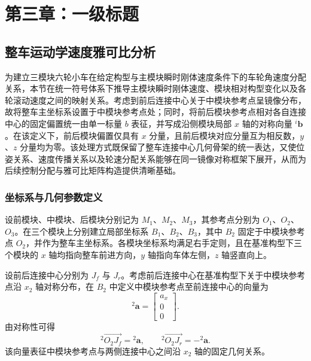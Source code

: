 \setlength{\baselineskip}{20pt}
\chapter{第三章：一级标题}
\label{cha:chap3}
\section{整车运动学速度雅可比分析}

为建立三模块六轮小车在给定构型与主模块瞬时刚体速度条件下的车轮角速度分配关系，本节在统一符号体系下推导主模块瞬时刚体速度、模块相对构型变化以及各轮滚动速度之间的映射关系。考虑到前后连接中心关于中模块参考点呈镜像分布，故将整车主坐标系设置于中模块参考点处；同时，将前后模块参考点相对各自连接中心的固定偏置统一由单一标量 $b$ 表征，并写成沿侧模块局部 $x$ 轴的对称向量 ${}^{i}\mathbf b$。在该定义下，前后模块偏置仅具有 $x$ 分量，且前后模块对应分量互为相反数，$y$、$z$ 分量均为零。该处理方式既保留了整车连接中心几何骨架的统一表达，又使位姿关系、速度传播关系以及轮速分配关系能够在同一镜像对称框架下展开，从而为后续控制分配与雅可比矩阵构造提供清晰基础。

\subsection{坐标系与几何参数定义}

设前模块、中模块、后模块分别记为 $M_1$、$M_2$、$M_3$，其参考点分别为 $O_1$、$O_2$、$O_3$。在三个模块上分别建立局部坐标系 ${B_1}$、${B_2}$、${B_3}$，其中 ${B_2}$ 固定于中模块参考点 $O_2$，并作为整车主坐标系。各模块坐标系均满足右手定则，且在基准构型下三个模块的 $x$ 轴均指向整车前进方向，$y$ 轴指向车体左侧，$z$ 轴竖直向上。

设前后连接中心分别为 $J_f$ 与 $J_r$。考虑前后连接中心在基准构型下关于中模块参考点沿 $x_2$ 轴对称分布，在 ${B_2}$ 中定义中模块参考点至前连接中心的向量为
\begin{equation}
{}^{2}\mathbf a=
\begin{bmatrix}
a_x\\
0\\
0
\end{bmatrix}.
\end{equation}
由对称性可得
\begin{equation}
{}^{2}\overrightarrow{O_2J_f}={}^{2}\mathbf a,
\qquad
{}^{2}\overrightarrow{O_2J_r}=-{}^{2}\mathbf a.
\end{equation}
该向量表征中模块参考点与两侧连接中心之间沿 $x_2$ 轴的固定几何关系。

